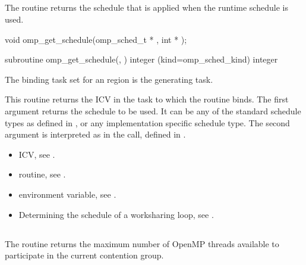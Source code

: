 \subsection{}
\label{subsec:omp_get_schedule}
\summary
The  routine returns the schedule that is applied when the 
runtime schedule is used. 
\format
\ccppspecificstart
\begin{boxedcode}
void omp\_get\_schedule(omp\_sched\_t * , int * ); 
\end{boxedcode}
\ccppspecificend

\fortranspecificstart
\begin{boxedcode}
subroutine omp\_get\_schedule(, ) 
integer (kind=omp\_sched\_kind)  
integer 
\end{boxedcode}
\fortranspecificend

\binding
The binding task set for an  region is the generating task. 

\effect
This routine returns the  ICV in the task to which the routine binds. The 
first argument  returns the schedule to be used. It can be any of the standard 
schedule types as defined in 
, 
or any implementation specific 
schedule type. The second argument is interpreted as in the  call, 
defined in 
.

\crossreferences
\begin{itemize}
\item {} ICV, see 
.

\item {} routine, see 
.

\item {} environment variable, see 
.

\item Determining the schedule of a worksharing loop, see 
.
\end{itemize}









\subsection{}
\label{subsec:omp_get_thread_limit}
\summary
The  routine returns the maximum number of OpenMP 
threads available to participate in the current contention group. 

